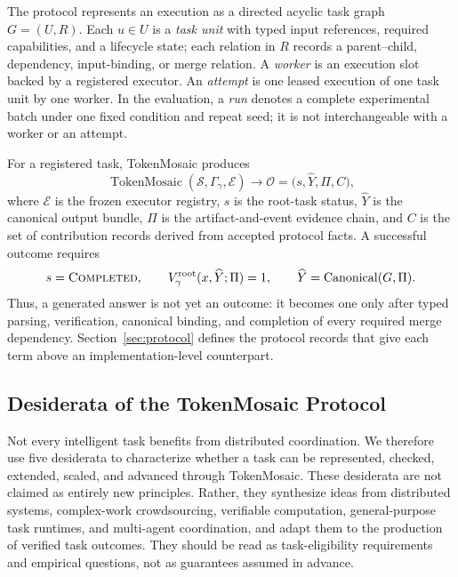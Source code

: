 \documentclass{article}
\theoremstyle{plain}
\begin{document}
The protocol represents an execution as a directed acyclic task graph $G=(U,R)$. Each $u \in U$ is a \emph{task unit} with typed input references, required capabilities, and a lifecycle state; each relation in $R$ records a parent--child, dependency, input-binding, or merge relation. A \emph{worker} is an execution slot backed by a registered executor. An \emph{attempt} is one leased execution of one task unit by one worker. In the evaluation, a \emph{run} denotes a complete experimental batch under one fixed condition and repeat seed; it is not interchangeable with a worker or an attempt.

For a registered task, TokenMosaic produces
\begin{equation}
    \operatorname{TokenMosaic}(\mathcal{S}, \Gamma_{\gamma}, \mathcal{E})
    \longrightarrow
    \mathcal{O}
    =
    \bigl(s, \widehat{Y}, \Pi, C\bigr),
\end{equation}
where $\mathcal{E}$ is the frozen executor registry, $s$ is the root-task status, $\widehat{Y}$ is the canonical output bundle, $\Pi$ is the artifact-and-event evidence chain, and $C$ is the set of contribution records derived from accepted protocol facts. A successful outcome requires
\begin{equation}
    s = \textsc{Completed},
    \qquad
    V_{\gamma}^{\mathrm{root}}(x, \widehat{Y}; \Pi) = 1,
    \qquad
    \widehat{Y} = \operatorname{Canonical}(G, \Pi).
\end{equation}
Thus, a generated answer is not yet an outcome: it becomes one only after typed parsing, verification, canonical binding, and completion of every required merge dependency. Section~\ref{sec:protocol} defines the protocol records that give each term above an implementation-level counterpart.

\subsection{Desiderata of the TokenMosaic Protocol}
\label{sec:desiderata}

Not every intelligent task benefits from distributed coordination. We therefore
use five desiderata to characterize whether a task can be represented, checked,
extended, scaled, and advanced through TokenMosaic. These desiderata are not
claimed as entirely new principles. Rather, they synthesize ideas from
distributed systems, complex-work crowdsourcing, verifiable computation,
general-purpose task runtimes, and multi-agent coordination, and adapt them to
the production of verified task outcomes. They should be read as task-eligibility
requirements and empirical questions, not as guarantees assumed in advance.
\end{document}
